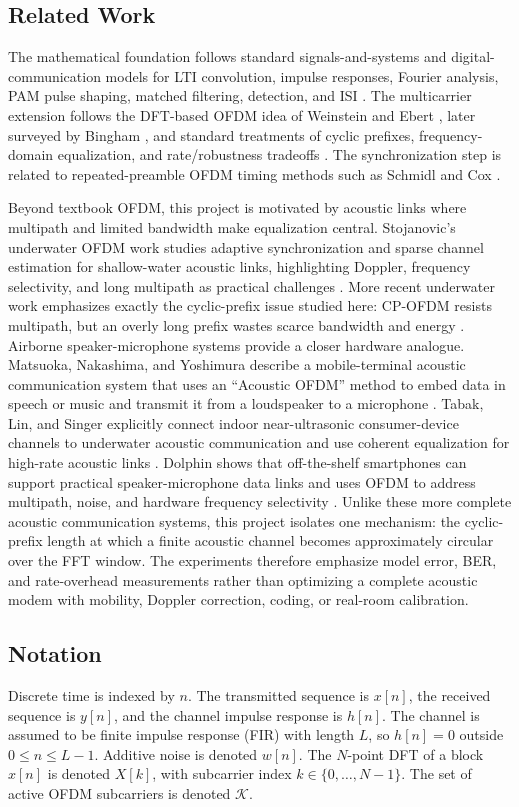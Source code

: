 \documentclass[conference]{IEEEtran}
\begin{document}
\subsection{Related Work}
The mathematical foundation follows standard signals-and-systems and digital-communication models for LTI convolution, impulse responses, Fourier analysis, PAM pulse shaping, matched filtering, detection, and ISI \cite{oppenheim1997,proakis2008}. The multicarrier extension follows the DFT-based OFDM idea of Weinstein and Ebert \cite{weinstein1971}, later surveyed by Bingham \cite{bingham1990}, and standard treatments of cyclic prefixes, frequency-domain equalization, and rate/robustness tradeoffs \cite{nee2000}. The synchronization step is related to repeated-preamble OFDM timing methods such as Schmidl and Cox \cite{schmidl1997}. 

Beyond textbook OFDM, this project is motivated by acoustic links where multipath and limited bandwidth make equalization central. Stojanovic's underwater OFDM work studies adaptive synchronization and sparse channel estimation for shallow-water acoustic links, highlighting Doppler, frequency selectivity, and long multipath as practical challenges \cite{stojanovic2008}. More recent underwater work emphasizes exactly the cyclic-prefix issue studied here: CP-OFDM resists multipath, but an overly long prefix wastes scarce bandwidth and energy \cite{feng2023}. Airborne speaker-microphone systems provide a closer hardware analogue. Matsuoka, Nakashima, and Yoshimura describe a mobile-terminal acoustic communication system that uses an ``Acoustic OFDM'' method to embed data in speech or music and transmit it from a loudspeaker to a microphone \cite{matsuoka2006}. Tabak, Lin, and Singer explicitly connect indoor near-ultrasonic consumer-device channels to underwater acoustic communication and use coherent equalization for high-rate acoustic links \cite{tabak2021}. Dolphin shows that off-the-shelf smartphones can support practical speaker-microphone data links and uses OFDM to address multipath, noise, and hardware frequency selectivity \cite{wang2016}. Unlike these more complete acoustic communication systems, this project isolates one mechanism: the cyclic-prefix length at which a finite acoustic channel becomes approximately circular over the FFT window. The experiments therefore emphasize model error, BER, and rate-overhead measurements rather than optimizing a complete acoustic modem with mobility, Doppler correction, coding, or real-room calibration.

\subsection{Notation}
Discrete time is indexed by $n$. The transmitted sequence is $x[n]$, the received sequence is $y[n]$, and the channel impulse response is $h[n]$. The channel is assumed to be finite impulse response (FIR) with length $L$, so $h[n]=0$ outside $0\leq n\leq L-1$. Additive noise is denoted $w[n]$. The $N$-point DFT of a block $x[n]$ is denoted $X[k]$, with subcarrier index $k\in\{0,\ldots,N-1\}$. The set of active OFDM subcarriers is denoted $\mathcal{K}$.
\end{document}
